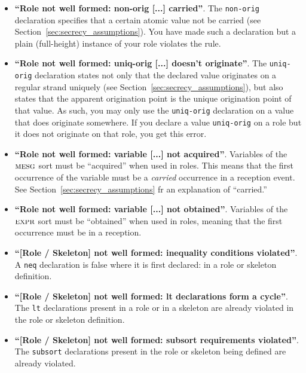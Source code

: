 \begin{itemize}
\item \textbf{``Role not well formed: non-orig [...] carried''}.  The \texttt{non-orig}
  declaration specifies that a certain atomic value not be carried
  (see Section~\ref{sec:secrecy_assumptions}).  You have made such a declaration but a
  plain (full-height) instance of your role violates the rule.

  \item \textbf{``Role not well formed: uniq-orig [...] doesn't
    originate''}.  The \texttt{uniq-orig} declaration states not only
  that the declared value originates on a regular strand uniquely (see
  Section~\ref{sec:secrecy_assumptions}), but also states that the
  apparent origination point is the unique origination point of that
  value.  As such, you may only use the \texttt{uniq-orig} declaration
  on a value that does originate somewhere.  If you declare a value
  \texttt{uniq-orig} on a role but it does not originate on that role,
  you get this error.

\item \textbf{``Role not well formed: variable [...] not acquired''}.
  Variables of the $\scap{mesg}$ sort must be ``acquired'' when used
  in roles.  This means that the first occurrence of the variable must
  be a \emph{carried} occurrence in a reception event.  See
  Section~\ref{sec:secrecy_assumptions} fr an explanation of
  ``carried.''

  \item \textbf{``Role not well formed: variable [...] not
    obtained''}.  Variables of the %
  $\scap{expr}$ sort must be ``obtained'' when used in roles, meaning
  that the first occurrence must be in a reception.

\item \textbf{``[Role / Skeleton] not well formed: inequality
  conditions violated''}.  A \texttt{neq} declaration is false where
  it is first declared: in a role or skeleton definition.

\item \textbf{``[Role / Skeleton] not well formed: lt declarations form a cycle''}.  The
  \texttt{lt} declarations present in a role or in a skeleton are already violated in
  the role or skeleton definition.

\item \textbf{``[Role / Skeleton] not well formed: subsort requirements violated''}.  The
  \texttt{subsort} declarations present in the role or skeleton being defined are already
  violated.


\end{itemize}
